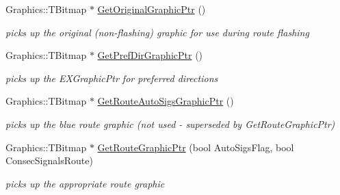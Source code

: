 \begin{DoxyCompactItemize}
\item 
\mbox{\label{class_t_pref_dir_element_a9181d9e11c34c6660c43fe2cf4ee35a8}} 
Graphics\+::\+T\+Bitmap $\ast$ \mbox{\hyperlink{class_t_pref_dir_element_a9181d9e11c34c6660c43fe2cf4ee35a8}{Get\+Original\+Graphic\+Ptr}} ()
\begin{DoxyCompactList}\small\item\em picks up the original (non-\/flashing) graphic for use during route flashing \end{DoxyCompactList}\item 
\mbox{\label{class_t_pref_dir_element_a10b4ff375e779de7cc2a16344959bb31}} 
Graphics\+::\+T\+Bitmap $\ast$ \mbox{\hyperlink{class_t_pref_dir_element_a10b4ff375e779de7cc2a16344959bb31}{Get\+Pref\+Dir\+Graphic\+Ptr}} ()
\begin{DoxyCompactList}\small\item\em picks up the E\+X\+Graphic\+Ptr for preferred directions \end{DoxyCompactList}\item 
\mbox{\label{class_t_pref_dir_element_aee43c641cd4a0550b55105a08ba2cef2}} 
Graphics\+::\+T\+Bitmap $\ast$ \mbox{\hyperlink{class_t_pref_dir_element_aee43c641cd4a0550b55105a08ba2cef2}{Get\+Route\+Auto\+Sigs\+Graphic\+Ptr}} ()
\begin{DoxyCompactList}\small\item\em picks up the blue route graphic (not used -\/ superseded by Get\+Route\+Graphic\+Ptr) \end{DoxyCompactList}\item 
\mbox{\label{class_t_pref_dir_element_ad58c8d4fa30c04fa9d8e84ae55c7ce61}} 
Graphics\+::\+T\+Bitmap $\ast$ \mbox{\hyperlink{class_t_pref_dir_element_ad58c8d4fa30c04fa9d8e84ae55c7ce61}{Get\+Route\+Graphic\+Ptr}} (bool Auto\+Sigs\+Flag, bool Consec\+Signals\+Route)
\begin{DoxyCompactList}\small\item\em picks up the appropriate route graphic \end{DoxyCompactList}\end{DoxyCompactItemize}
